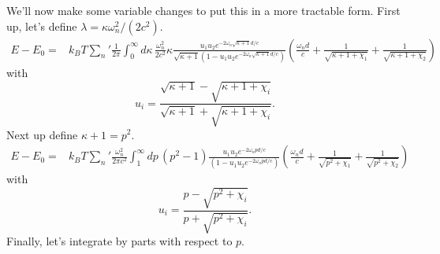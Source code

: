 We'll now make some variable changes to put this in a more tractable form.  First up, let's define $\lambda = \kappa \omega_n^2/(2c^2)$.  
\begin{align}
E-E_0%
=&k_BT{\sum_n}'\frac{1}{2\pi}\int_0^\infty d\kappa\,\frac{\omega_n^2}{2c^2} \kappa  \frac{u_1u_2 e^{-2\omega_n\sqrt{\kappa+1}d/c}}{\sqrt{\kappa+1}(1-u_1u_2 e^{-2\omega_n\sqrt{\kappa+1}d/c})}\left( \frac{\omega_nd}{c} + \frac{1}{\sqrt{\kappa+1+\chi_1}} + \frac{1}{\sqrt{\kappa+1+\chi_2}} \right)
\end{align}
with
\begin{equation}
u_i = \frac{\sqrt{\kappa+1}-\sqrt{\kappa+1+\chi_i}}{\sqrt{\kappa +1}+\sqrt{\kappa+1+\chi_i}}.
\end{equation}
Next up define $\kappa+1 = p^2$.  
\begin{align}
E-E_0%
=&k_BT{\sum_n}'\frac{\omega_n^2}{2\pi c^2}\int_1^\infty dp\,(p^2-1)  \frac{u_1u_2 e^{-2\omega_n pd/c}}{(1-u_1u_2 e^{-2\omega_npd/c})}\left( \frac{\omega_nd}{c} + \frac{1}{\sqrt{p^2+\chi_1}} + \frac{1}{\sqrt{p^2+\chi_2}} \right)
\end{align}
with
\begin{equation}
u_i = \frac{p-\sqrt{p^2+\chi_i}}{p+\sqrt{p^2+\chi_i}}.
\end{equation}
Finally, let's integrate by parts with respect to $p$.  
